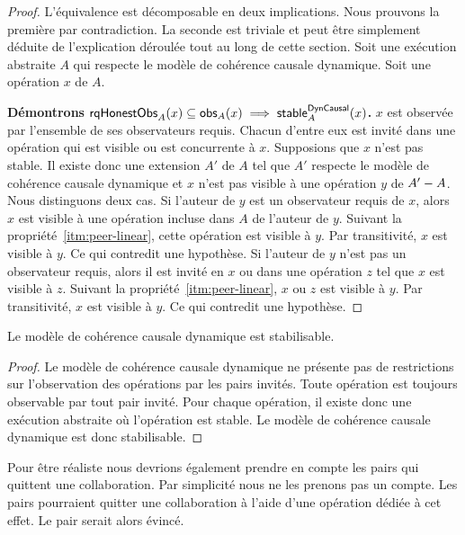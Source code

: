 \begin{proof}
L'équivalence est décomposable en deux implications.
Nous prouvons la première par contradiction.
La seconde est triviale et peut être simplement déduite de l'explication déroulée tout au long de cette section.
Soit une exécution abstraite $A$ qui respecte le modèle de cohérence causale dynamique.
Soit une opération $x$ de $A$.

\textbf{Démontrons $\operatorname{\mathsf{rqHonestObs}}_A(x) \subseteq \operatorname{\mathsf{obs}}_A(x) \implies \operatorname{\mathsf{stable}}_A^{\operatorname{\mathsf{DynCausal}}}(x)$.}
$x$ est observée par l'ensemble de ses observateurs requis.
Chacun d'entre eux est invité dans une opération qui est visible ou est concurrente à $x$.
Supposions que $x$ n'est pas stable.
Il existe donc une extension $A'$ de $A$ tel que $A'$ respecte le modèle de cohérence causale dynamique et $x$ n'est pas visible à une opération $y$ de $A' - A$.
Nous distinguons deux cas.
Si l'auteur de $y$ est un observateur requis de $x$, alors $x$ est visible à une opération incluse dans $A$ de l'auteur de $y$.
Suivant la propriété~\ref{itm:peer-linear}, cette opération est visible à $y$.
Par transitivité, $x$ est visible à $y$.
Ce qui contredit une hypothèse.
Si l'auteur de $y$ n'est pas un observateur requis, alors il est invité en $x$ ou dans une opération $z$ tel que $x$ est visible à $z$.
Suivant la propriété~\ref{itm:peer-linear}, $x$ ou $z$ est visible à $y$.
Par transitivité, $x$ est visible à $y$.
Ce qui contredit une hypothèse.
\end{proof}


\begin{theorem}\label{th:stabilizable-dyn-causal}
Le modèle de cohérence causale dynamique est stabilisable.
\end{theorem}

\begin{proof}
Le modèle de cohérence causale dynamique ne présente pas de restrictions sur l'observation des opérations par les pairs invités.
Toute opération est toujours observable par tout pair invité.
Pour chaque opération, il existe donc une exécution abstraite où l'opération est stable.
Le modèle de cohérence causale dynamique est donc stabilisable.
\end{proof}

Pour être réaliste nous devrions également prendre en compte les pairs qui quittent une collaboration.
Par simplicité nous ne les prenons pas un compte.
Les pairs pourraient quitter une collaboration à l'aide d'une opération dédiée à cet effet.
Le pair serait alors évincé.

